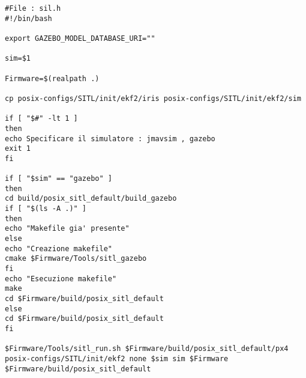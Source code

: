 \lstset{language=bash}
\begin{lstlisting}
#File : sil.h
#!/bin/bash

export GAZEBO_MODEL_DATABASE_URI=""

sim=$1

Firmware=$(realpath .)

cp posix-configs/SITL/init/ekf2/iris posix-configs/SITL/init/ekf2/sim

if [ "$#" -lt 1 ]
then
echo Specificare il simulatore : jmavsim , gazebo
exit 1
fi

if [ "$sim" == "gazebo" ] 
then
cd build/posix_sitl_default/build_gazebo
if [ "$(ls -A .)" ]
then
echo "Makefile gia' presente"
else
echo "Creazione makefile"
cmake $Firmware/Tools/sitl_gazebo
fi
echo "Esecuzione makefile"
make
cd $Firmware/build/posix_sitl_default
else
cd $Firmware/build/posix_sitl_default
fi

$Firmware/Tools/sitl_run.sh $Firmware/build/posix_sitl_default/px4  posix-configs/SITL/init/ekf2 none $sim sim $Firmware $Firmware/build/posix_sitl_default
\end{lstlisting}
%
%
%
%
